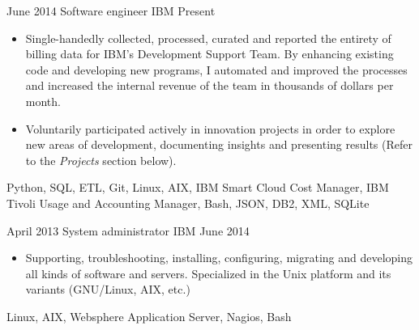 %
%
%


\begin{experiences}
    \experience
        {June 2014}
        {Software engineer}
        {IBM}
        {Present}
        {
            \begin{itemize}
                \item Single-handedly collected, processed, curated and 
                    reported the entirety of billing data for IBM's Development 
                    Support Team. By enhancing existing code and developing new 
                    programs, I automated and improved the processes and 
                    increased the internal revenue of the team in thousands of 
                    dollars per month.
                \item Voluntarily participated actively in innovation projects 
                    in order to explore new areas of development, documenting 
                    insights and presenting results (Refer to the 
                    \emph{Projects} section below).
            \end{itemize}
        }
        {
            Python,
            SQL,
            ETL,
            Git,
            Linux,
            AIX,
            IBM Smart Cloud Cost Manager,
            IBM Tivoli Usage and Accounting Manager,
            Bash,
            JSON,
            DB2,
            XML,
            SQLite
        }

    \emptySeparator

    \experience
        {April 2013}
        {System administrator}
        {IBM}
        {June 2014}
        {
            \begin{itemize}
                \item Supporting, troubleshooting, installing, configuring, 
                    migrating and developing all kinds of software and servers. 
                    Specialized in the Unix platform and its variants 
                    (GNU/Linux, AIX, etc.)
            \end{itemize}
        }
        {
            Linux,
            AIX,
            Websphere Application Server,
            Nagios,
            Bash
        }


\end{experiences}
